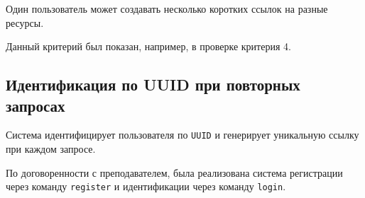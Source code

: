 \documentclass[a4paper, 14pt]{article}
\begin{document}
Один пользователь может создавать несколько коротких ссылок на разные ресурсы.

Данный критерий был показан, например, в проверке критерия 4.

\subsection{Идентификация по UUID при повторных запросах}

Система идентифицирует пользователя по \texttt{UUID} и генерирует уникальную ссылку при каждом запросе.

По договоренности с преподавателем, была реализована система регистрации через команду \texttt{register} и идентификации через команду \texttt{login}.
\end{document}
